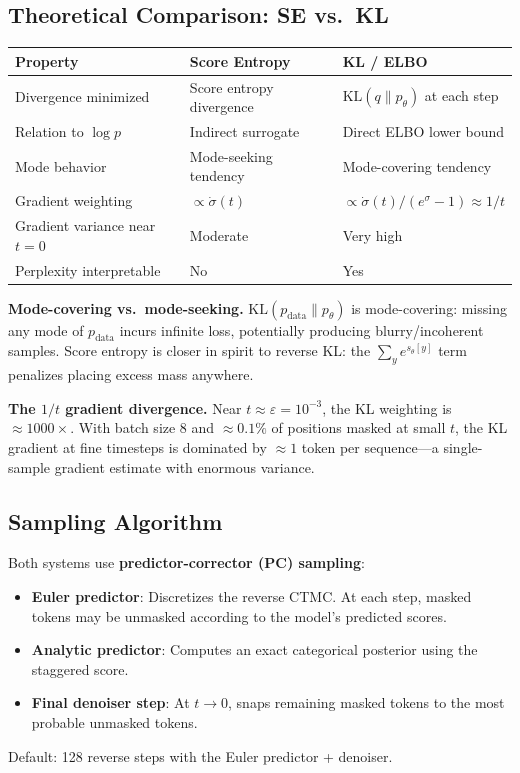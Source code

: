 \documentclass[11pt,a4paper]{article}
\begin{document}
\subsection{Theoretical Comparison: SE vs.\ KL}

\begin{center}
\begin{tabular}{lll}
\toprule
Property & Score Entropy & KL / ELBO \\
\midrule
Divergence minimized & Score entropy divergence & $\mathrm{KL}(q \| p_\theta)$ at each step \\
Relation to $\log p$ & Indirect surrogate & Direct ELBO lower bound \\
Mode behavior & Mode-seeking tendency & Mode-covering tendency \\
Gradient weighting & $\propto \dot{\sigma}(t)$ & $\propto \dot{\sigma}(t)/(e^\sigma - 1) \approx 1/t$ \\
Gradient variance near $t=0$ & Moderate & Very high \\
Perplexity interpretable & No & Yes \\
\bottomrule
\end{tabular}
\end{center}

\textbf{Mode-covering vs.\ mode-seeking.} $\mathrm{KL}(p_\text{data} \| p_\theta)$ is mode-covering: missing any mode of $p_\text{data}$ incurs infinite loss, potentially producing blurry/incoherent samples. Score entropy is closer in spirit to reverse KL: the $\sum_y e^{s_\theta[y]}$ term penalizes placing excess mass anywhere.

\textbf{The $1/t$ gradient divergence.} Near $t \approx \varepsilon = 10^{-3}$, the KL weighting is $\approx 1000\times$. With batch size 8 and $\approx 0.1\%$ of positions masked at small $t$, the KL gradient at fine timesteps is dominated by $\approx 1$ token per sequence---a single-sample gradient estimate with enormous variance.

\subsection{Sampling Algorithm}

Both systems use \textbf{predictor-corrector (PC) sampling}:
\begin{itemize}[nosep]
  \item \textbf{Euler predictor}: Discretizes the reverse CTMC. At each step, masked tokens may be unmasked according to the model's predicted scores.
  \item \textbf{Analytic predictor}: Computes an exact categorical posterior using the staggered score.
  \item \textbf{Final denoiser step}: At $t \to 0$, snaps remaining masked tokens to the most probable unmasked tokens.
\end{itemize}
Default: 128 reverse steps with the Euler predictor + denoiser.
\end{document}
